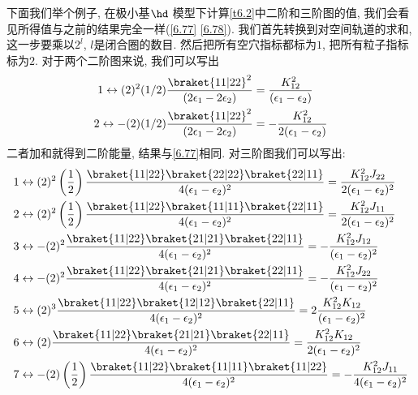 下面我们举个例子, 
在极小基$\hd$ 模型下计算\autoref{t6.2}中二阶和三阶图的值, 
我们会看见所得值与之前的结果完全一样(\autoref{6.77} \eqref{6.78}). 
我们首先转换到对空间轨道的求和, 
这一步要乘以$2^l$, 
$l$是闭合圈的数目. 
然后把所有空穴指标都标为$1$, 
把所有粒子指标标为$2$. 
对于两个二阶图来说, 
我们可以写出
\begin{align*}
1\leftrightarrow (2)^2(1/2)\frac{\braket{11|22}^2}{(2\epsilon_1-2\epsilon_2)} & = \frac{K_{12}^2}{(\epsilon_1-\epsilon_2)}\\
2\leftrightarrow -(2)(1/2)\frac{\braket{11|22}^2}{(2\epsilon_1-2\epsilon_2)} & = -\frac{K_{12}^2}{2(\epsilon_1-\epsilon_2)}
\end{align*}
二者加和就得到二阶能量, 
结果与\autoref{6.77}相同. 
对三阶图我们可以写出:
\begin{align*}
1&\leftrightarrow (2)^2\left( \frac{1}{2} \right) \frac{\braket{11|22}\braket{22|22}\braket{22|11}}{4(\epsilon_1 - \epsilon_2)^2}   = \frac{K_{12}^2J_{22}}{2(\epsilon_1 - \epsilon_2)^2}\\
2&\leftrightarrow (2)^2\left( \frac{1}{2} \right) \frac{\braket{11|22}\braket{11|11}\braket{22|11}}{4(\epsilon_1 - \epsilon_2)^2}   = \frac{K_{12}^2J_{11}}{2(\epsilon_1 - \epsilon_2)^2}\\
3&\leftrightarrow -(2)^2 \frac{\braket{11|22}\braket{21|21}\braket{22|11}}{4(\epsilon_1 - \epsilon_2)^2}   = -\frac{K_{12}^2J_{12}}{(\epsilon_1 - \epsilon_2)^2}\\
4&\leftrightarrow -(2)^2 \frac{\braket{11|22}\braket{21|21}\braket{22|11}}{4(\epsilon_1 - \epsilon_2)^2}   = -\frac{K_{12}^2J_{22}}{(\epsilon_1 - \epsilon_2)^2}\\
5&\leftrightarrow (2)^3 \frac{\braket{11|22}\braket{12|12}\braket{22|11}}{4(\epsilon_1 - \epsilon_2)^2}   = 2\frac{K_{12}^2K_{12}}{(\epsilon_1 - \epsilon_2)^2}\\
6&\leftrightarrow (2) \frac{\braket{11|22}\braket{21|21}\braket{22|11}}{4(\epsilon_1 - \epsilon_2)^2}   = \frac{K_{12}^2K_{12}}{2(\epsilon_1 - \epsilon_2)^2}\\
7&\leftrightarrow -(2)\left( \frac{1}{2} \right) \frac{\braket{11|22}\braket{11|11}\braket{11|22}}{4(\epsilon_1 - \epsilon_2)^2}   = -\frac{K_{12}^2J_{11}}{4(\epsilon_1 - \epsilon_2)^2}
\end{align*}
